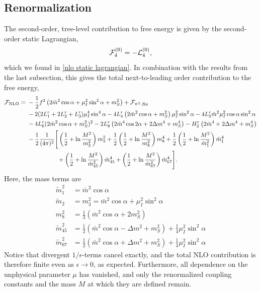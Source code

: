 \subsection{Renormalization}


The second-order, tree-level contribution to free energy is given by the second-order static Lagrangian,
%
\begin{equation}
    \mathcal{F}^{(0)}_4 = - \mathcal{L}_4^{(0)},
\end{equation}
%
which we found in \autoref{nlo static lagrangian}.
In combination with the results from the last subsection, this gives the total next-to-leading order contribution to the free energy,
%
\begin{align}
    \nonumber
    \mathcal{F}_{\text{NLO}}
    ={}&
    -\frac{1}{2} f^2 
    \left( 2 \bar m^2 \cos\alpha + \mu_I^2 \sin^2\alpha + m_S^2\right)
    + \mathcal{F}_{{\pi^\pm},\text{fin}} \\ \nonumber
    &-2(2L_1^r + 2L_2^r + L_3^r) \mu_I^4 \sin^4\alpha
    - 4  L_4^r \left( 2 \bar m^2 \cos\alpha + m_S^2 \right) \mu_I^2\sin^2\alpha
    - 4 L_5^r \bar m^2 \mu_I^2 \cos\alpha \sin^2 \alpha 
    \\ \nonumber
    & 
    - 4 L_6^r (2\bar m^2\cos\alpha + m_S^2)^2
    - 2 L_8^r \left(2 \bar m^4 \cos2\alpha + 2 \Delta m^4 + m_S^4\right)
    - H_2^r \left(2\bar m^4 + 2\Delta m^4 + m_S^4 \right) \\\nonumber
    & - \frac{1}{2} \frac{1}{(4 \pi)^2}  
    \Bigg[
        \left(
            \frac{1}{2} + \ln\frac{M^2}{m_3^2}
        \right)
        m_3^2
        + 
        \frac{1}{2}
        \left(
            \frac{1}{2} + \ln\frac{M^2}{m_8^2} 
        \right)
        m_8^4
        +
        \frac{1}{2}
        \left(
            \frac{1}{2} + \ln\frac{M^2}{\tilde m_1^2}
        \right)
        \tilde m_1^4
        \\
        & 
        \quad\quad\quad\quad\quad
        +
        \left(
            \frac{1}{2} + \ln\frac{M^2}{\tilde m_{45}^2}
        \right)
        \tilde m_{45}^4
        +
        \left(
            \frac{1}{2} + \ln\frac{M^2}{\tilde m_{67}^2} 
        \right)
        \tilde m_{67}^4
    \Bigg].
\end{align}
%
Here, the mass terms are
%
\begin{align}
    \tilde m_1^2 
    & =
    \bar m^2 \cos\alpha \\
    \tilde m_2 &= m_3^2 = \bar m^2 \cos\alpha + \mu_I^2 \sin^2\alpha \\
    m_8^2 & = \frac{1}{3} (\bar m^2 \cos\alpha + 2m_S^2) \\
    \tilde m_{45}^2 & 
    = \frac{1}{2}(\bar m^2 \cos \alpha - \Delta m^2 + m_S^2)
    + \frac{1}{4} \mu_I^2\sin^2\alpha \\
    \tilde m_{67}^2 & 
    = \frac{1}{2}(\bar m^2 \cos \alpha + \Delta m^2 + m_S^2)
    + \frac{1}{4} \mu_I^2\sin^2\alpha
\end{align}
%
Notice that divergent $1/\epsilon$-terms cancel exactly, and the total NLO contribution is therefore finite even as $\epsilon\rightarrow 0$, as expected.
Furthermore, all dependence on the unphysical parameter $\mu$ has vanished, and only the renormalized coupling constants and the mass $M$ at which they are defined remain.

